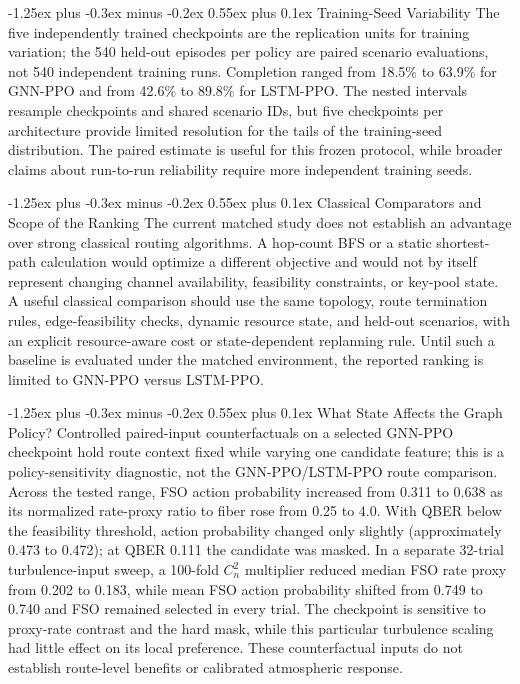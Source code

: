 \documentclass[journal]{IEEEtran}
\makeatletter
\def\subsection{\@startsection{subsection}{2}{\z@}%
  {-1.25ex plus -0.3ex minus -0.2ex}%
  {0.55ex plus 0.1ex}%
  {\normalfont\bfseries\fontsize{10}{12}\selectfont}}
\makeatother
\begin{document}
\subsection{Training-Seed Variability}
The five independently trained checkpoints are the replication units for training variation; the 540 held-out episodes per policy are paired scenario evaluations, not 540 independent training runs. Completion ranged from 18.5\% to 63.9\% for GNN-PPO and from 42.6\% to 89.8\% for LSTM-PPO. The nested intervals resample checkpoints and shared scenario IDs, but five checkpoints per architecture provide limited resolution for the tails of the training-seed distribution. The paired estimate is useful for this frozen protocol, while broader claims about run-to-run reliability require more independent training seeds.

\subsection{Classical Comparators and Scope of the Ranking}
The current matched study does not establish an advantage over strong classical routing algorithms. A hop-count BFS or a static shortest-path calculation would optimize a different objective and would not by itself represent changing channel availability, feasibility constraints, or key-pool state. A useful classical comparison should use the same topology, route termination rules, edge-feasibility checks, dynamic resource state, and held-out scenarios, with an explicit resource-aware cost or state-dependent replanning rule. Until such a baseline is evaluated under the matched environment, the reported ranking is limited to GNN-PPO versus LSTM-PPO.

\subsection{What State Affects the Graph Policy?}
Controlled paired-input counterfactuals on a selected GNN-PPO checkpoint hold route context fixed while varying one candidate feature; this is a policy-sensitivity diagnostic, not the GNN-PPO/LSTM-PPO route comparison. Across the tested range, FSO action probability increased from 0.311 to 0.638 as its normalized rate-proxy ratio to fiber rose from 0.25 to 4.0. With QBER below the feasibility threshold, action probability changed only slightly (approximately 0.473 to 0.472); at QBER 0.111 the candidate was masked. In a separate 32-trial turbulence-input sweep, a 100-fold $C_n^2$ multiplier reduced median FSO rate proxy from 0.202 to 0.183, while mean FSO action probability shifted from 0.749 to 0.740 and FSO remained selected in every trial. The checkpoint is sensitive to proxy-rate contrast and the hard mask, while this particular turbulence scaling had little effect on its local preference. These counterfactual inputs do not establish route-level benefits or calibrated atmospheric response.
\end{document}
